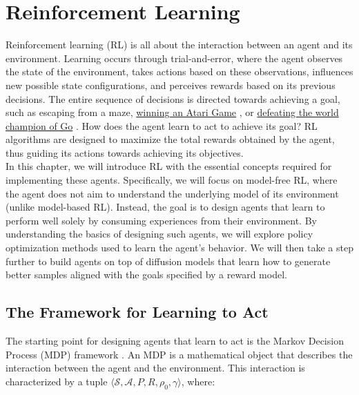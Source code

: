\chapter{Reinforcement Learning}

Reinforcement learning (RL) \cite{Sutton1998} is all about the interaction between an agent and its environment. Learning occurs through trial-and-error, where the agent observes the state of the environment, takes actions based on these observations, influences new possible state configurations, and perceives rewards based on its previous decisions. The entire sequence of decisions is directed towards achieving a goal, such as escaping from a maze, \href{https://arxiv.org/abs/1312.5602}{winning an Atari Game} \citep{mnih2013playing}, or \href{https://deepmind.google/technologies/alphago/}{defeating the world champion of Go} \citep{silver2016mastering}. How does the agent learn to act to achieve its goal? RL algorithms are designed to maximize the total rewards obtained by the agent, thus guiding its actions towards achieving its objectives. \\

\noindent In this chapter, we will introduce RL with the essential concepts required for implementing these agents. Specifically, we will focus on model-free RL, where the agent does not aim to understand the underlying model of its environment (unlike model-based RL). Instead, the goal is to design agents that learn to perform well solely by consuming experiences from their environment. By understanding the basics of designing such agents, we will explore policy optimization methods used to learn the agent’s behavior. We will then take a step further to build agents on top of diffusion models that learn how to generate better samples aligned with the goals specified by a reward model.

\section{The Framework for Learning to Act}

The starting point for designing agents that learn to act is the Markov Decision Process (MDP) framework \cite{Sutton1998}. An MDP is a mathematical object that describes the interaction between the agent and the environment. This interaction is characterized by a tuple $\langle \mathcal{S}, \mathcal{A}, P, R, \rho_{0}, \gamma \rangle$, where:

